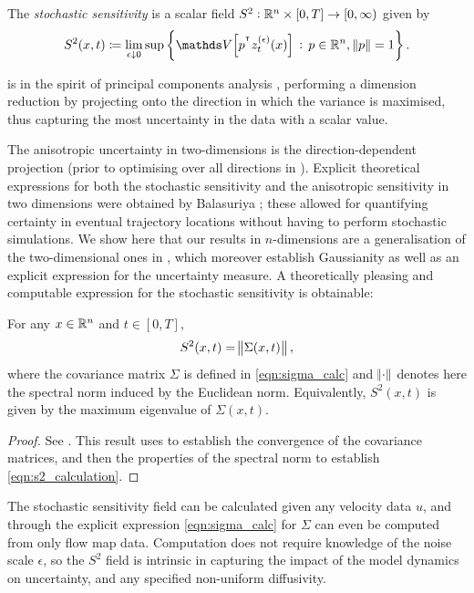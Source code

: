 \begin{definition}\label{def:ss_Rn}
	The \emph{stochastic sensitivity} is a scalar field \(S^2: \mathbb{R}^n \times [0,T] \to \left[0, \infty\right)\) given by
	\begin{equation*}
		S^2(x,t) \coloneqq \lim_{\epsilon\downarrow 0}\sup\set{\var{p^{\T}z_t^{(\epsilon)}(x)} \,: \, p \in \R^n, \, \norm{p} = 1}.
	\end{equation*}
\end{definition}

 is in the spirit of principal components analysis \cite{Jolliffe_2002_PrincipalComponentAnalysis}, performing a dimension reduction by projecting onto the direction in which the variance is maximised, thus capturing the most uncertainty in the data with a scalar value. 

The anisotropic uncertainty in two-dimensions \cite{Balasuriya_2020_StochasticSensitivityComputable} is the direction-dependent projection (prior to optimising over all directions in ).
Explicit theoretical expressions for both the stochastic sensitivity and the anisotropic sensitivity in two dimensions were obtained by Balasuriya \cite{Balasuriya_2020_StochasticSensitivityComputable}; these allowed for quantifying certainty in eventual trajectory locations without having to perform stochastic simulations. 
We show here that our results in \(n\)-dimensions are a generalisation of the two-dimensional ones in \cite{Balasuriya_2020_StochasticSensitivityComputable}, which moreover establish Gaussianity as well as an explicit expression for the uncertainty measure.  
A theoretically pleasing and computable expression for the stochastic sensitivity is obtainable:


\begin{theorem}[Computation of \(S^2\)]\label{thm:s2_calculation}
	For any \(x \in \mathbb{R}^n\) and \(t \in [0,T]\),
	\begin{equation}
		S^2(x,t) = \norm{\Sigma(x,t)},
		\label{eqn:s2_calculation}
	\end{equation}
 where the covariance matrix $ \Sigma $ is defined in \eqref{eqn:sigma_calc} and \(\norm{\cdot}\) denotes here the spectral norm induced by the Euclidean norm.
	Equivalently, \(S^2(x,t)\) is given by the maximum eigenvalue of \(\Sigma(x,t)\).
\end{theorem}
\begin{proof}
	See .
	This result uses  to establish the convergence of the covariance matrices, and then the properties of the spectral norm to establish \eqref{eqn:s2_calculation}.
\end{proof}
The stochastic sensitivity field can be calculated given any velocity data \(u\), and through the explicit expression \eqref{eqn:sigma_calc} for \(\Sigma\) can even be computed from only flow map data.
Computation does not require knowledge of the noise scale \(\epsilon\), so the \(S^2\) field is intrinsic in capturing the impact of the model dynamics on uncertainty, and any specified non-uniform diffusivity.


